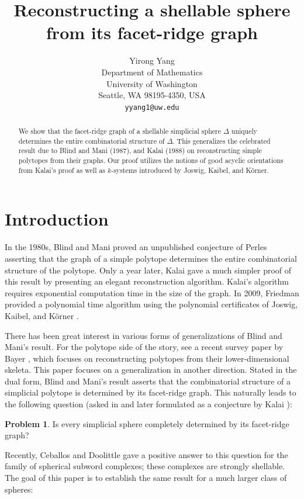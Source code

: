 \documentclass[11pt,twoside]{article}
\title{Reconstructing a shellable sphere from its facet-ridge graph}
\author{Yirong Yang\\
\small Department of Mathematics\\
\small University of Washington\\
\small Seattle, WA 98195-4350, USA\\
\small \texttt{yyang1@uw.edu}
}
\date{}
\theoremstyle{definition}
\newtheorem{problem}[theorem]{Problem}
\begin{document}
\maketitle

\begin{abstract}
    We show that the facet-ridge graph of a shellable simplicial sphere $\Delta$ uniquely determines the entire combinatorial structure of $\Delta$. This generalizes the celebrated result due to Blind and Mani (1987), and Kalai (1988) on reconstructing simple polytopes from their graphs. Our proof utilizes the notions of good acyclic orientations from Kalai's proof as well as $k$-systems introduced by Joswig, Kaibel, and K\"orner. 
\end{abstract}

\section{Introduction}\label{sec:intro}
In the 1980s, Blind and Mani \cite{Mani} proved an unpublished conjecture of Perles asserting that the graph of a simple polytope determines the entire combinatorial structure of the polytope. Only a year later, Kalai \cite{Kalai} gave a much simpler proof of this result by presenting an elegant reconstruction algorithm. Kalai's algorithm requires exponential computation time in the size of the graph. In 2009, Friedman \cite{Friedman} provided a polynomial time algorithm using the polynomial certificates of Joswig, Kaibel, and K\"orner \cite{Joswig}.

There has been great interest in various forms of generalizations of Blind and Mani's result. For the polytope side of the story, see a recent survey paper by Bayer \cite{Bayer}, which focuses on reconstructing polytopes from their lower-dimensional skeleta. This paper focuses on a generalization in another direction. Stated in the dual form, Blind and Mani's result asserts that the combinatorial structure of a simplicial polytope is determined by its facet-ridge graph. This naturally leads to the following question (asked in \cite{Mani} and later formulated as a conjecture by Kalai \cite{Kalai3}):

\begin{problem}\label{prob:main}
    Is every simplicial sphere completely determined by its facet-ridge graph? 
\end{problem}

Recently, Ceballos and Doolittle \cite{Ceballos} gave a positive answer to this question for the family of spherical subword complexes; these complexes are strongly shellable. The goal of this paper is to establish the same result for a much larger class of spheres:
\end{document}
